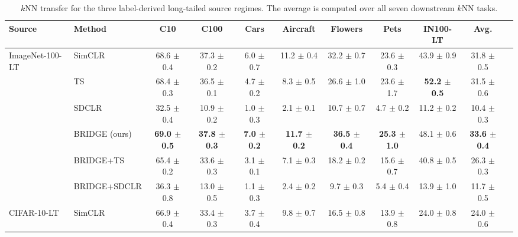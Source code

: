 \begin{table}[t]
\centering
\tiny
\setlength{\tabcolsep}{3.0pt}
\caption{$k$NN transfer for the three label-derived long-tailed source regimes. The average is computed over all seven downstream $k$NN tasks.}
\label{tab:main_sota_label_sources_knn}
\begin{adjustbox}{max width=\textwidth}
\begin{tabular}{l l c c c c c c c c c}
\toprule
Source & Method & C10 & C100 & Cars & Aircraft & Flowers & Pets & IN100-LT & Avg. \\
\midrule
ImageNet-100-LT & SimCLR & 68.6 {\scriptsize$\pm$ 0.4} & 37.3 {\scriptsize$\pm$ 0.2} & 6.0 {\scriptsize$\pm$ 0.7} & 11.2 {\scriptsize$\pm$ 0.4} & 32.2 {\scriptsize$\pm$ 0.7} & 23.6 {\scriptsize$\pm$ 0.3} & 43.9 {\scriptsize$\pm$ 0.9} & 31.8 {\scriptsize$\pm$ 0.5} \\
 & TS & 68.4 {\scriptsize$\pm$ 0.3} & 36.5 {\scriptsize$\pm$ 0.1} & 4.7 {\scriptsize$\pm$ 0.2} & 8.3 {\scriptsize$\pm$ 0.5} & 26.6 {\scriptsize$\pm$ 1.0} & 23.6 {\scriptsize$\pm$ 1.7} & \textbf{52.2 {\scriptsize$\pm$ 0.5}} & 31.5 {\scriptsize$\pm$ 0.6} \\
 & SDCLR & 32.5 {\scriptsize$\pm$ 0.4} & 10.9 {\scriptsize$\pm$ 0.2} & 1.0 {\scriptsize$\pm$ 0.3} & 2.1 {\scriptsize$\pm$ 0.1} & 10.7 {\scriptsize$\pm$ 0.7} & 4.7 {\scriptsize$\pm$ 0.2} & 11.2 {\scriptsize$\pm$ 0.2} & 10.4 {\scriptsize$\pm$ 0.3} \\
\rowcolor{blue!10}  & BRIDGE (ours) & \textbf{69.0 {\scriptsize$\pm$ 0.5}} & \textbf{37.8 {\scriptsize$\pm$ 0.3}} & \textbf{7.0 {\scriptsize$\pm$ 0.2}} & \textbf{11.7 {\scriptsize$\pm$ 0.2}} & \textbf{36.5 {\scriptsize$\pm$ 0.4}} & \textbf{25.3 {\scriptsize$\pm$ 1.0}} & 48.1 {\scriptsize$\pm$ 0.6} & \textbf{33.6 {\scriptsize$\pm$ 0.4}} \\
 & BRIDGE+TS & 65.4 {\scriptsize$\pm$ 0.2} & 33.6 {\scriptsize$\pm$ 0.3} & 3.1 {\scriptsize$\pm$ 0.1} & 7.1 {\scriptsize$\pm$ 0.3} & 18.2 {\scriptsize$\pm$ 0.2} & 15.6 {\scriptsize$\pm$ 0.7} & 40.8 {\scriptsize$\pm$ 0.5} & 26.3 {\scriptsize$\pm$ 0.3} \\
 & BRIDGE+SDCLR & 36.3 {\scriptsize$\pm$ 0.8} & 13.0 {\scriptsize$\pm$ 0.5} & 1.1 {\scriptsize$\pm$ 0.3} & 2.4 {\scriptsize$\pm$ 0.2} & 9.7 {\scriptsize$\pm$ 0.3} & 5.4 {\scriptsize$\pm$ 0.4} & 13.9 {\scriptsize$\pm$ 1.0} & 11.7 {\scriptsize$\pm$ 0.5} \\
\midrule
CIFAR-10-LT & SimCLR & 66.9 {\scriptsize$\pm$ 0.4} & 33.4 {\scriptsize$\pm$ 0.3} & 3.7 {\scriptsize$\pm$ 0.4} & 9.8 {\scriptsize$\pm$ 0.7} & 16.5 {\scriptsize$\pm$ 0.8} & 13.9 {\scriptsize$\pm$ 0.8} & 24.0 {\scriptsize$\pm$ 0.8} & 24.0 {\scriptsize$\pm$ 0.6} \\

\end{tabular}
\end{adjustbox}
\end{table}

